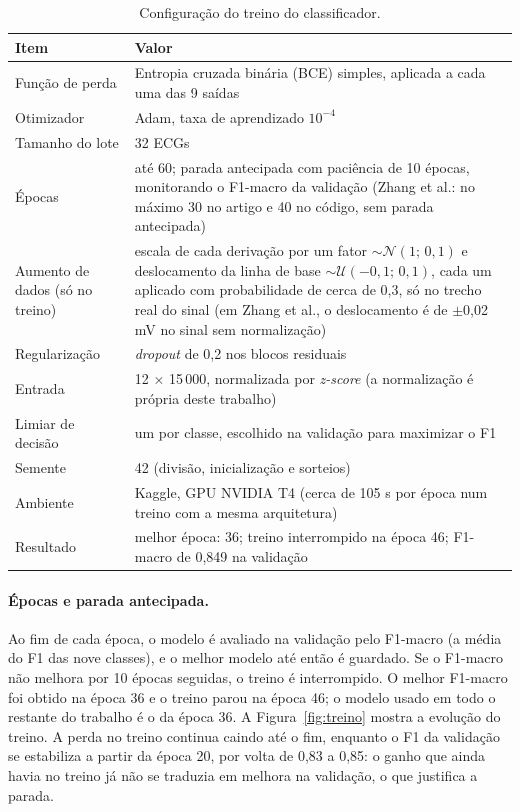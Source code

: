 \documentclass[11pt,a4paper]{article}
\newcommand{\fonte}[1]{\par\vspace{2pt}{\centering\footnotesize Fonte: #1\par}}
\begin{document}
\begin{table}[H]\centering\small
\caption{Configuração do treino do classificador.}\label{tab:treino}
\begin{tabularx}{\linewidth}{>{\raggedright\arraybackslash}p{4.3cm}X}
\toprule
\textbf{Item} & \textbf{Valor} \\
\midrule
Função de perda & Entropia cruzada binária (BCE) simples, aplicada a cada uma das 9 saídas \\
Otimizador & Adam, taxa de aprendizado $10^{-4}$ \\
Tamanho do lote & 32 ECGs \\
Épocas & até 60; parada antecipada com paciência de 10 épocas, monitorando o F1-macro da validação (Zhang et al.: no máximo 30 no artigo e 40 no código, sem parada antecipada) \\
Aumento de dados (só no treino) & escala de cada derivação por um fator $\sim\mathcal{N}(1;\,0{,}1)$ e deslocamento da linha de base $\sim\mathcal{U}(-0{,}1;\,0{,}1)$, cada um aplicado com probabilidade de cerca de 0,3, só no trecho real do sinal (em Zhang et al., o deslocamento é de $\pm$0,02 mV no sinal sem normalização) \\
Regularização & \textit{dropout} de 0,2 nos blocos residuais \\
Entrada & 12 × 15\,000, normalizada por \textit{z-score} (a normalização é própria deste trabalho) \\
Limiar de decisão & um por classe, escolhido na validação para maximizar o F1 \\
Semente & 42 (divisão, inicialização e sorteios) \\
Ambiente & Kaggle, GPU NVIDIA T4 (cerca de 105 s por época num treino com a mesma arquitetura) \\
\midrule
Resultado & melhor época: 36; treino interrompido na época 46; F1-macro de 0,849 na validação \\
\bottomrule
\end{tabularx}
\fonte{Elaborado pelo autor.}
\end{table}

\paragraph{Épocas e parada antecipada.} Ao fim de cada época, o modelo é avaliado na validação pelo F1-macro (a média do F1 das nove classes), e o melhor modelo até então é guardado. Se o F1-macro não melhora por 10 épocas seguidas, o treino é interrompido. O melhor F1-macro foi obtido na época 36 e o treino parou na época 46; o modelo usado em todo o restante do trabalho é o da época 36. A Figura~\ref{fig:treino} mostra a evolução do treino. A perda no treino continua caindo até o fim, enquanto o F1 da validação se estabiliza a partir da época 20, por volta de 0,83 a 0,85: o ganho que ainda havia no treino já não se traduzia em melhora na validação, o que justifica a parada.
\end{document}
